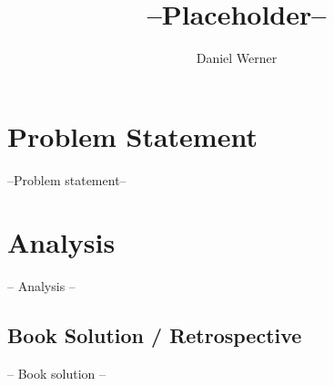 \documentclass{article}
\title{--Placeholder--}
\author{Daniel Werner}
\begin{document}
\maketitle

\section*{
    Problem Statement
}

--Problem statement--

\section*{
    Analysis
}

-- Analysis --

\subsection* {
  Book Solution / Retrospective
}

-- Book solution --
\end{document}
